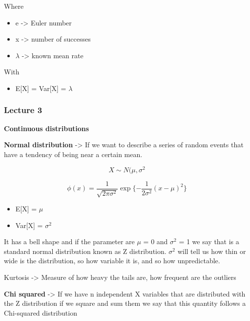 Where

\begin{itemize}
    \item e -> Euler number
    \item x -> number of successes
    \item $\lambda $ -> known mean rate
\end{itemize}

With
\begin{itemize}
    \item E[X] = Var[X] = $\lambda$
\end{itemize}

\subsubsection{Lecture 3}

\textbf{Continuous distributions}

\vspace{10pt}


\textbf{Normal distribution} -> If we want to describe a series of random events that have a tendency of being near a certain mean.

\begin{equation}
    X \sim N(\mu, \sigma^2
\end{equation}

\begin{equation}
    \phi (x) = \frac{1}{\sqrt{2\pi\sigma^2}} \exp{\{-\frac{1}{2\sigma^2} (x-\mu)^2\}}
\end{equation}

\begin{itemize}
    \item E[X] = $\mu$
    \item Var[X] = $\sigma^2$
\end{itemize}

It has a bell shape and if the parameter are $\mu$ = 0 and $\sigma^2$ = 1 we say that is a standard normal distribution known as Z distribution. $\sigma^2$ will tell us how thin or wide is the distribution, so how variable it is, and so how unpredictable. 

Kurtosis -> Measure of how heavy the tails are, how frequent are the outliers

\vspace{10pt}

\vspace{10pt}

\textbf{Chi squared} -> If we have n independent X variables that are distributed with the Z distribution if we square and sum them we say that this quantity follows a Chi-squared distribution

